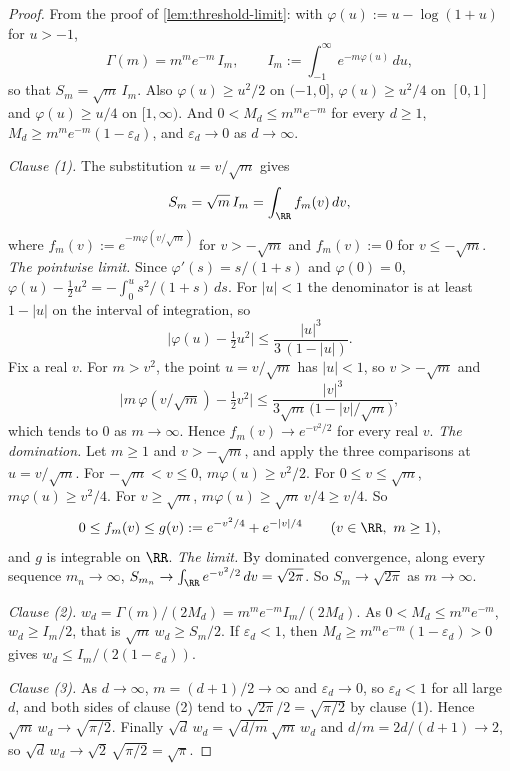 \begin{proof}
\leanok
From the proof of \ref{lem:threshold-limit}: with $\varphi(u) := u - \log(1+u)$ for $u > -1$,
\[
  \Gamma(m) = m^m e^{-m}\,I_m , \qquad I_m := \int_{-1}^\infty e^{-m\varphi(u)}\,du ,
\]
so that $S_m = \sqrt m\,I_m$. Also $\varphi(u) \ge u^2/2$ on $(-1,0]$, $\varphi(u) \ge u^2/4$ on
$[0,1]$ and $\varphi(u) \ge u/4$ on $[1,\infty)$. And $0 < M_d \le m^m e^{-m}$ for every
$d \ge 1$, $M_d \ge m^m e^{-m}(1 - \varepsilon_d)$, and $\varepsilon_d \to 0$ as $d \to \infty$.

\emph{Clause (1).} The substitution $u = v/\sqrt m$ gives
\[
  S_m = \sqrt m\,I_m = \int_{\RR} f_m(v)\,dv ,
\]
where $f_m(v) := e^{-m\varphi(v/\sqrt m)}$ for $v > -\sqrt m$ and $f_m(v) := 0$ for
$v \le -\sqrt m$.
\emph{The pointwise limit.} Since $\varphi'(s) = s/(1+s)$ and $\varphi(0) = 0$,
$\varphi(u) - \tfrac12 u^2 = -\int_0^u s^2/(1+s)\,ds$. For $|u| < 1$ the denominator is at least
$1 - |u|$ on the interval of integration, so
\[
  \bigl|\varphi(u) - \tfrac12 u^2\bigr| \le \frac{|u|^3}{3\,(1 - |u|)} .
\]
Fix a real $v$. For $m > v^2$, the point $u = v/\sqrt m$ has $|u| < 1$, so $v > -\sqrt m$ and
\[
  \bigl|m\,\varphi(v/\sqrt m) - \tfrac12 v^2\bigr|
   \le \frac{|v|^3}{3\sqrt m\,\bigl(1 - |v|/\sqrt m\bigr)} ,
\]
which tends to $0$ as $m \to \infty$. Hence $f_m(v) \to e^{-v^2/2}$ for every real $v$.
\emph{The domination.} Let $m \ge 1$ and $v > -\sqrt m$, and apply the three comparisons at
$u = v/\sqrt m$. For $-\sqrt m < v \le 0$, $m\varphi(u) \ge v^2/2$. For $0 \le v \le \sqrt m$,
$m\varphi(u) \ge v^2/4$. For $v \ge \sqrt m$, $m\varphi(u) \ge \sqrt m\,v/4 \ge v/4$. So
\[
  0 \le f_m(v) \le g(v) := e^{-v^2/4} + e^{-|v|/4} \qquad (v \in \RR,\ m \ge 1),
\]
and $g$ is integrable on $\RR$. \emph{The limit.} By dominated convergence, along every sequence
$m_n \to \infty$, $S_{m_n} \to \int_{\RR}e^{-v^2/2}\,dv = \sqrt{2\pi}$. So $S_m \to \sqrt{2\pi}$ as
$m \to \infty$.

\emph{Clause (2).} $w_d = \Gamma(m)/(2M_d) = m^m e^{-m}I_m/(2M_d)$. As $0 < M_d \le m^m e^{-m}$,
$w_d \ge I_m/2$, that is $\sqrt m\,w_d \ge S_m/2$. If $\varepsilon_d < 1$, then
$M_d \ge m^m e^{-m}(1 - \varepsilon_d) > 0$ gives $w_d \le I_m/(2(1 - \varepsilon_d))$.

\emph{Clause (3).} As $d \to \infty$, $m = (d+1)/2 \to \infty$ and $\varepsilon_d \to 0$, so
$\varepsilon_d < 1$ for all large $d$, and both sides of clause (2) tend to $\sqrt{2\pi}/2 =
\sqrt{\pi/2}$ by clause (1). Hence $\sqrt m\,w_d \to \sqrt{\pi/2}$. Finally
$\sqrt d\,w_d = \sqrt{d/m}\,\sqrt m\,w_d$ and $d/m = 2d/(d+1) \to 2$, so
$\sqrt d\,w_d \to \sqrt2\,\sqrt{\pi/2} = \sqrt\pi$.


\end{proof}
